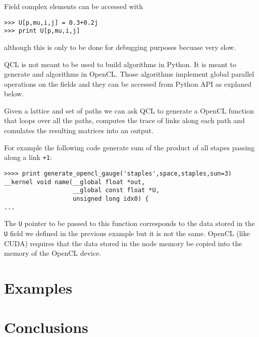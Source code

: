 \documentclass[12pt]{article}
\def\ft{\small\tt}
\begin{document}
Field complex elements can be accessed with
\begin{lstlisting}
>>> U[p,mu,i,j] = 0.3+0.2j
>>> print U[p,mu,i,j]
\end{lstlisting}
although this is only to be done for debugging purposes becuase very slow.

QCL is not meant to be used to build algorithms in Python. It is meant to generate and algorithms in OpenCL. Those algorithms implement global parallel operations on the fields and they can be accessed from Python API as explaned below.

Given a lattice and set of paths we can ask QCL to generate a OpenCL function that loops over all the paths, computes the trace of links along each path and comulates the resulting matrices into an output.

For example the following code generate sum of the product of all stapes passing along a link {\ft +1}:


\begin{lstlisting}
>>>> print generate_opencl_gauge('staples',space,staples,sun=3)
__kernel void name(__global float *out,                                        
                   __global const float *U,
                   unsigned long idx0) {
...
\end{lstlisting}

The {\ft U} pointer to be passed to this function corresponds to the data stored in the {\ft U} field we defined in the previous example but it is not the same. OpenCL (like CUDA) requires that the data stored in the node memory be copied into the memory of the OpenCL device. 

\section{Examples}

\section{Conclusions}
\end{document}
